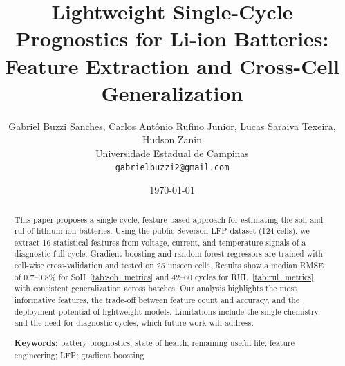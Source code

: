 \documentclass[11pt]{article}
\begin{document}

\title{Lightweight Single-Cycle Prognostics for Li-ion Batteries: Feature Extraction and Cross-Cell Generalization}
\author{Gabriel Buzzi Sanches, Carlos Antônio Rufino Junior, Lucas Saraiva Texeira, Hudson Zanin \\
\small Universidade Estadual de Campinas \\
\small \texttt{gabrielbuzzi2@gmail.com}}
\date{\today}

\maketitle

\begin{abstract}
    This paper proposes a single-cycle, feature-based approach for estimating the \acf{soh} and \acf{rul} of lithium-ion batteries. Using the public Severson LFP dataset (124 cells), we extract 16 statistical features from voltage, current, and temperature signals of a diagnostic full cycle. Gradient boosting and random forest regressors are trained with cell-wise cross-validation and tested on 25 unseen cells. Results show a median RMSE of 0.7--0.8\% for SoH~\cref{tab:soh_metrics} and 42--60 cycles for RUL~\cref{tab:rul_metrics}, with consistent generalization across batches. Our analysis highlights the most informative features, the trade-off between feature count and accuracy, and the deployment potential of lightweight models. Limitations include the single chemistry and the need for diagnostic cycles, which future work will address.

    \noindent \textbf{Keywords:} battery prognostics; state of health; remaining useful life; feature engineering; LFP; gradient boosting
\end{abstract}
\end{document}
